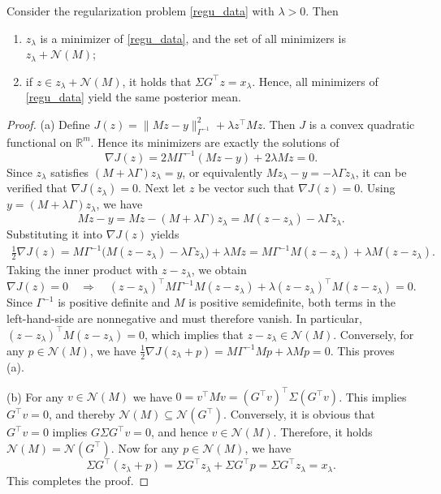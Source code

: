 \documentclass[]{myarticle}
\begin{document}
\begin{proposition}\label{prop:zlambda-variational}
Consider the regularization problem \cref{regu_data} with \(\lambda>0\). Then 
\begin{enumerate}
  \item[(a)] \(z_\lambda\) is a minimizer of \cref{regu_data}, and the set of all minimizers is $z_\lambda+\mathcal N(M)$;
  \item[(b)] if \(z\in z_\lambda+\mathcal N(M)\), it holds that $\Sigma G^\top z = x_\lambda$. Hence, all minimizers of \cref{regu_data} yield the same posterior mean.
\end{enumerate}
\end{proposition}
\begin{proof}
(a) Define $J(z)=\|Mz-y\|_{\Gamma^{-1}}^2+\lambda z^\top M z.$ Then \(J\) is a convex quadratic functional on \(\mathbb R^m\). Hence its minimizers are exactly the solutions of 
\[\nabla J(z) = 2M \Gamma^{-1}(Mz-y)+2\lambda Mz = 0.\]
Since $z_{\lambda}$ satisfies $(M+\lambda\Gamma)z_\lambda=y$, or equivalently $Mz_\lambda-y=-\lambda\Gamma z_\lambda$, it can be verified that $\nabla J(z_\lambda)=0$. Next let \(z\) be vector such that $\nabla J(z)=0$. Using \(y=(M+\lambda\Gamma)z_\lambda\), we have
\[Mz-y = Mz-(M+\lambda\Gamma)z_\lambda= M(z-z_\lambda)-\lambda\Gamma z_\lambda.\]
Substituting it into $\nabla J(z)$ yields
\begin{align*}
\frac{1}{2}\nabla J(z)=M\Gamma^{-1}\bigl(M(z-z_\lambda)-\lambda\Gamma z_\lambda\bigr)+\lambda Mz 
=M\Gamma^{-1}M(z-z_\lambda)+\lambda M(z-z_\lambda).
\end{align*}
Taking the inner product with \(z-z_\lambda\), we obtain
\[\nabla J(z)= 0 \quad \Rightarrow \quad (z-z_\lambda)^\top M\Gamma^{-1}M(z-z_\lambda)
+ \lambda (z-z_\lambda)^\top M(z-z_\lambda)=0.\]
Since $\Gamma^{-1}$ is positive definite and $M$ is positive semidefinite, both terms in the left-hand-side are nonnegative and must therefore vanish. In particular, $(z - z_\lambda)^\top M (z - z_\lambda) = 0$, which implies that $z - z_\lambda \in \mathcal{N}(M)$. Conversely, for any \(p\in\mathcal N(M)\), we have $\frac{1}{2}\nabla J(z_\lambda+p)=M\Gamma^{-1}Mp+\lambda Mp=0$. This proves (a).

(b) For any \(v\in\mathcal N(M)\) we have $0=v^\top Mv = (G^\top v)^\top \Sigma (G^\top v)$.
This implies $G^\top v=0$, and thereby $\mathcal N(M)\subseteq \mathcal N(G^\top)$. Conversely, it is obvious that $G^\top v=0$ implies $G\Sigma G^\top v=0$, and hence $v\in \mathcal N(M)$. Therefore, it holds $\mathcal N(M)=\mathcal N(G^\top)$. Now for any $p\in\mathcal N(M)$, we have 
\[\Sigma G^\top(z_\lambda+p)
=\Sigma G^\top z_\lambda+\Sigma G^\top p = \Sigma G^\top z_\lambda=x_{\lambda}.\]
This completes the proof.
\end{proof}
\end{document}
